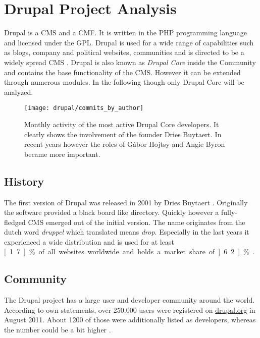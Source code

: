 \section{Drupal Project Analysis} %


\noindent Drupal is a \ac{CMS} and a \ac{CMF}. It is written in the PHP
programming language and licensed under the \ac{GPL}. Drupal is used for a wide
range of capabilities such as blogs, company and political websites,
communities and is directed to be a widely spread \ac{CMS}
\cite{DrupalOverview}. Drupal is also known as \emph{Drupal Core} inside the
Community and contains the base functionality of the \ac{CMS}. However it can
be extended through numerous modules. In the following though only Drupal Core
will be analyzed.

\begin{figure}[htbp]
  \centering
  \texttt{[image: drupal/commits\_by\_author]}
  \caption[Commits by Most Active Authors, Drupal]
  {Monthly activity of the most active Drupal Core developers. It clearly shows
    the involvement of the founder Dries Buytaert. In recent years however the
    roles of Gábor Hojtsy and Angie Byron became more important.}
  \label{fig:drupal:cba}
\end{figure}

\subsection{History} %

The first version of Drupal was released in 2001 by Dries Buytaert
\cite{DrupalHistory}. Originally the software provided a black board like
directory. Quickly however a fully-fledged \ac{CMS} emerged out of the initial
version. The name originates from the dutch word \emph{druppel} which
translated means \emph{drop}. Especially in the last years it
experienced a wide distribution and is used for at least \unit[1.7]{\%} of all
websites worldwide and holds a market share of \unit[6.2]{\%}
\cite{DrupalBuiltWith,DrupalW3Techs}.


\subsection{Community} %

The Drupal project has a large user and developer community around the world.
According to own statements, over 250.000 users were registered on
\url{drupal.org} in August 2011. About 1200 of those were additionally listed
as developers, whereas the number could be a bit higher \cite{DrupalBuytaert}.

